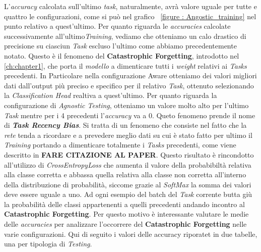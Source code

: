 L'\textit{accuracy} calcolata sull'ultimo \textit{task}, naturalmente, avrà valore uguale per tutte e quattro le configurazioni, come si può nel grafico ~\ref{figure : Angostic_training} nel punto relativo a quest'ultimo.
\newline
Per quanto riguarda le \textit{accuracies} calcolate successivamente all'ultimo\textit{Training}, vediamo che otteniamo un calo drastico di precisione su ciasciun \textit{Task} escluso l'ultimo come abbiamo precedentemente notato. Questo è il fenomeno del \textbf{Catastrophic Forgetting}, introdotto nel \autoref{ch:chapter1}, che porta il \textit{modello} a dimenticare tutti i \textit{weight} relativi ai \textit{Tasks} precedenti.
In Particolare nella configurazione Aware otteniamo dei valori migliori dati dall'output più preciso e specifico per il relativo \textit{Task}, ottenuto selezionando la \textit{Classification Head} realtiva a quest'ultimo. Per quanto riguarda la configurazione di \textit{Agnostic Testing}, otteniamo un valore molto alto per l'ultimo \textit{Task} mentre per i 4 precedenti l'\textit{accuracy} va a 0. Queto fenomeno prende il nome di 
\textit{\textbf{Task Recency Bias}}. Si tratta di un fenomeno che consiste nel fatto che la \textit{rete} tenda a ricordare e a prevedere meglio dati su cui è stato fatto per ultimo il \textit{Training} portando a dimenticare totalmente i \textit{Tasks} precedenti, come viene descritto in \textbf{FARE CITAZIONE AL PAPER}. Questo risultato è rincondotto all'utilizzo di \textit{CrossEntropyLoss}  che aumenta il valore della probabibiltà relativa alla classe corretta e abbassa quella relativa alla classe non corretta all'interno della distribuzione di probabilità, siccome grazie al \textit{SoftMax} la somma dei valori deve essere uguale a uno. Ad ogni esempio del batch del \textit{Task} corrente butta giù la probabilità delle classi appartenenti a quelli precedenti andando incontro al \textbf{Catastrophic Forgetting}.
\newline
Per questo motivo è interessante valutare le medie delle \textit{accuracies} per analizzare l'occorrere del \textbf{Catastrophic Forgetting} nelle varie configurazioni.
Qui di seguito i valori delle accuracy riporatet in due tabelle, una per tipologia di \textit{Testing}.
